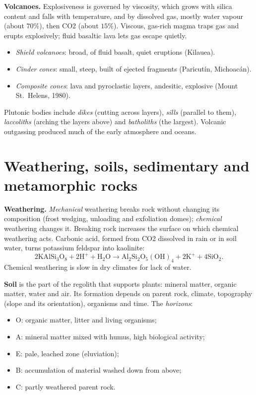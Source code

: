 \textbf{Volcanoes.} Explosiveness is
governed by viscosity, which grows with
silica content and falls with temperature,
and by dissolved gas, mostly water vapour
(about $70\%$), then CO2 (about $15\%$).
Viscous, gas-rich magma traps gas and
erupts explosively; fluid basaltic lava
lets gas escape quietly.
\begin{itemize}
\item \emph{Shield volcanoes}: broad, of
fluid basalt, quiet eruptions (Kilauea).
\item \emph{Cinder cones}: small, steep,
built of ejected fragments (Paricut\'in,
Michoac\'an).
\item \emph{Composite cones}: lava and
pyroclastic layers, andesitic, explosive
(Mount St.\ Helens, 1980).
\end{itemize}
Plutonic bodies include \emph{dikes}
(cutting across layers), \emph{sills}
(parallel to them), \emph{laccoliths}
(arching the layers above) and
\emph{batholiths} (the largest). Volcanic
outgassing produced much of the early
atmosphere and oceans.

\section{Weathering, soils, sedimentary and
metamorphic rocks}
\label{section-surface-rocks}

\textbf{Weathering.} \emph{Mechanical}
weathering breaks rock without changing its
composition (frost wedging, unloading and
exfoliation domes); \emph{chemical}
weathering changes it. Breaking rock
increases the surface on which chemical
weathering acts. Carbonic acid, formed from
CO2 dissolved in rain or in soil water,
turns potassium feldspar into kaolinite:
$$
\mathrm{2KAlSi_3O_8 + 2H^+ + H_2O
\rightarrow Al_2Si_2O_5(OH)_4
+ 2K^+ + 4SiO_2}.
$$
Chemical weathering is slow in dry climates
for lack of water.

\textbf{Soil} is the part of the regolith
that supports plants: mineral matter,
organic matter, water and air. Its
formation depends on parent rock, climate,
topography (slope and its orientation),
organisms and time. The \emph{horizons}:
\begin{itemize}
\item O: organic matter, litter and living
organisms;
\item A: mineral matter mixed with humus,
high biological activity;
\item E: pale, leached zone (eluviation);
\item B: accumulation of material washed
down from above;
\item C: partly weathered parent rock.
\end{itemize}

